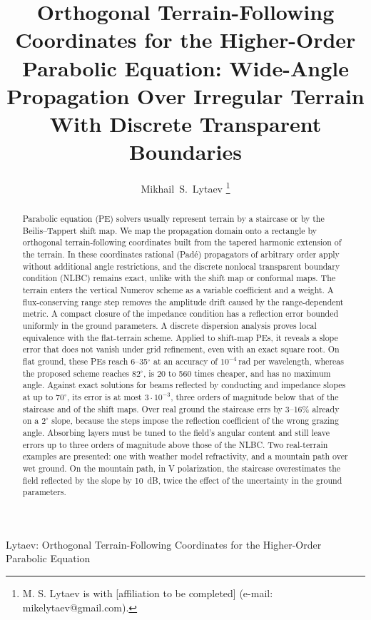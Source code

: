 \documentclass[journal]{IEEEtran}
\begin{document}
\title{Orthogonal Terrain-Following Coordinates for the Higher-Order Parabolic Equation: Wide-Angle Propagation Over Irregular Terrain With Discrete Transparent Boundaries}

\author{Mikhail~S.~Lytaev
\thanks{M. S. Lytaev is with [affiliation to be completed] (e-mail: mikelytaev@gmail.com).}}

%
{Lytaev: Orthogonal Terrain-Following Coordinates for the Higher-Order Parabolic Equation}

\maketitle

\begin{abstract}
Parabolic equation (PE) solvers usually represent terrain by a staircase or by
the Beilis--Tappert shift map. We map the propagation domain onto a rectangle
by orthogonal terrain-following coordinates built from the tapered harmonic
extension of the terrain. In these coordinates rational (Pad\'e) propagators of
arbitrary order apply without additional angle restrictions, and the discrete
nonlocal transparent boundary condition (NLBC) remains exact, unlike with the shift
map or conformal maps. The
terrain enters the vertical Numerov scheme as a variable coefficient and a
weight. A flux-conserving range step removes the amplitude drift caused by the
range-dependent metric. A compact closure of the impedance condition has a
reflection error bounded uniformly in the ground parameters. A discrete
dispersion analysis proves local equivalence with the flat-terrain scheme.
Applied to shift-map PEs, it reveals a slope error that does not
vanish under grid refinement, even with an exact square root. On flat ground,
these PEs reach 6--35$^\circ$ at an accuracy of $10^{-4}$\,rad per wavelength,
whereas the proposed scheme reaches $82^\circ$, is 20 to 560 times cheaper, and
has no maximum angle. Against exact solutions for beams reflected by
conducting and impedance slopes at up to $70^\circ$, its error is at
most $3\cdot10^{-3}$, three orders of magnitude below that of the
staircase and of the shift maps. Over real ground the staircase errs by
3--16\% already on a $2^\circ$ slope, because the steps impose the reflection
coefficient of the wrong grazing angle. Absorbing layers must be
tuned to the field's angular content and still leave errors up to three orders
of magnitude above those of the NLBC. Two real-terrain examples are presented:
one with weather model refractivity, and a mountain path over wet ground. On
the mountain path, in V polarization, the staircase overestimates the field
reflected by the slope by \SI{10}{dB}, twice the effect of the uncertainty in
the ground parameters.
\end{abstract}
\end{document}
